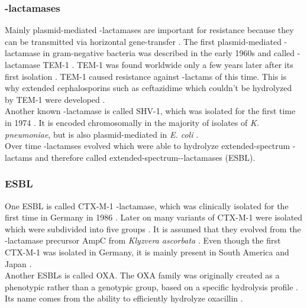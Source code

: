 \subsubsection{\textbeta-lactamases}
\label{section:resistance_mechanisms}
Mainly plasmid-mediated \textbeta-lactamases are important for resistance because they can be transmitted via horizontal gene-transfer \cite{munita_mechanisms_2016}.  
The first plasmid-mediated \textbeta-lactamase in gram-negative bacteria was described in the early 1960s and called \textbeta-lactamase TEM-1  \cite{fernandes_-lactams:_2013}. TEM-1 was found worldwide only a few years later after its first isolation \cite{fernandes_-lactams:_2013}. TEM-1 caused resistance against \textbeta-lactams of this time.  This is why extended cephalosporins such as ceftazidime which couldn't be hydrolyzed by TEM-1 were developed \cite{fernandes_-lactams:_2013}. \\
Another known \textbeta-lactamase is called SHV-1, which was isolated for the first time in 1974 \cite{kuzin_structure_1999}. It is encoded chromosomally in the majority of isolates of \textit{K. pneumoniae}, but is also plasmid-mediated in \textit{E. coli} \cite{kuzin_structure_1999}. \\
Over time \textbeta-lactamses evolved which were able to hydrolyze extended-spectrum \textbeta-lactams and therefore called extended-spectrum-\textbeta-lactamases (ESBL).  

\subsubsection{ESBL}
One ESBL is called CTX-M-1 \textbeta-lactamase, which was clinically isolated for the first time in Germany in 1986 \cite{bradford_extended-spectrum_2001}. Later on many variants of CTX-M-1 were isolated which were subdivided into five groups \cite{fernandes_-lactams:_2013}.
It is assumed that they evolved from the \textbeta-lactamase precursor AmpC from \textit{Klyzvera ascorbata}  \cite{bradford_extended-spectrum_2001}. Even though the first CTX-M-1 was isolated in Germany, it is mainly present in South America and Japan \cite{bradford_extended-spectrum_2001}. \\
Another ESBLs is called OXA.
The OXA family was originally created as a phenotypic rather than a genotypic group, based on a specific hydrolysis profile \cite{bradford_extended-spectrum_2001}. Its name comes from the ability to efficiently hydrolyze oxacillin \cite{bradford_extended-spectrum_2001}. \\

